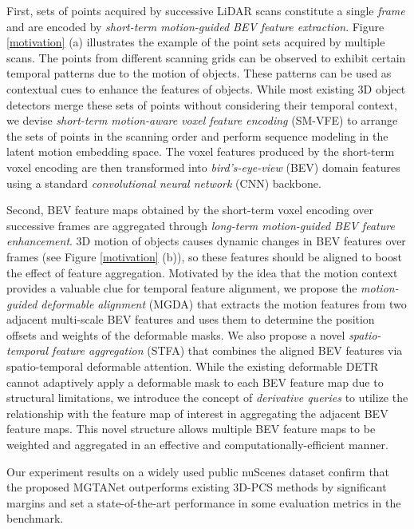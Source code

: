 \documentclass[letterpaper]{article} \usepackage{aaai23}  \usepackage{times}  \usepackage{helvet}  \usepackage{courier}  \usepackage[hyphens]{url}  \usepackage{graphicx} \urlstyle{rm} \def\UrlFont{\rm}  \usepackage{natbib}  \usepackage{caption} \frenchspacing  \setlength{\pdfpagewidth}{8.5in} \usepackage{algorithm}
\begin{document}
First,  sets of points acquired by successive LiDAR scans constitute a single {\it frame} and are encoded by {\it short-term motion-guided BEV feature extraction}. Figure \ref{motivation} (a) illustrates the example of the point sets acquired by multiple scans. The points from different scanning grids can be observed to exhibit certain temporal patterns due to the motion of objects. These patterns can be used as contextual cues to enhance the features of objects. While most existing 3D object detectors merge these sets of points without considering their temporal context, we devise {\it short-term motion-aware voxel feature encoding} (SM-VFE) to arrange the sets of points in the scanning order and perform sequence modeling in the latent motion embedding space. The voxel features produced by the short-term voxel encoding are then transformed into {\it bird's-eye-view} (BEV) domain features using a standard {\it convolutional neural network} (CNN) backbone.


Second,  BEV feature maps obtained by the short-term voxel encoding over  successive frames are aggregated through {\it long-term motion-guided BEV feature enhancement}.  3D motion of objects causes dynamic changes in BEV features over frames (see Figure \ref{motivation} (b)), so these features should be aligned to boost the effect of feature aggregation. Motivated by the idea that the motion context provides a valuable clue for temporal feature alignment, we propose the {\it motion-guided deformable alignment} (MGDA) that extracts the motion features from two adjacent multi-scale BEV features and uses them to determine the position offsets and weights of the deformable masks. We also propose a novel {\it spatio-temporal feature aggregation} (STFA) that combines the aligned BEV features via spatio-temporal deformable attention. While the existing deformable DETR \cite{def-detr} cannot adaptively apply a deformable mask to each BEV feature map due to structural limitations, we introduce the concept of {\it derivative queries} to utilize the relationship with the feature map of interest in aggregating the adjacent BEV feature maps. This novel structure allows multiple BEV feature maps to be weighted and aggregated in an effective and computationally-efficient manner.

Our experiment results on a widely used public nuScenes dataset \cite{nuscenes} confirm that the proposed MGTANet outperforms existing 3D-PCS methods by significant margins and set a  state-of-the-art performance in some evaluation metrics in the benchmark.
\end{document}
